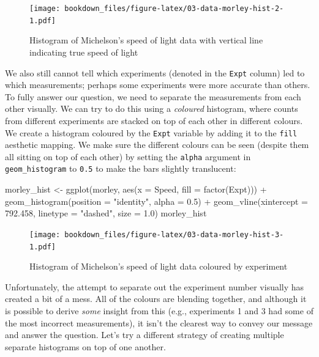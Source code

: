 \documentclass[
]{krantz}
\makeatletter
\newenvironment{Shaded}{\begin{snugshade}}{\end{snugshade}}
\newcommand{\AttributeTok}[1]{\textcolor[rgb]{0.61,0.61,0.61}{#1}}
\newcommand{\FloatTok}[1]{\textcolor[rgb]{0.06,0.06,0.06}{#1}}
\newcommand{\FunctionTok}[1]{\textcolor[rgb]{0,0,0}{#1}}
\newcommand{\NormalTok}[1]{#1}
\newcommand{\OtherTok}[1]{\textcolor[rgb]{0.37,0.37,0.37}{#1}}
\newcommand{\SpecialCharTok}[1]{\textcolor[rgb]{0,0,0}{#1}}
\newcommand{\StringTok}[1]{\textcolor[rgb]{0.5,0.5,0.5}{#1}}
\newenvironment{kframe}{%
\medskip{}
\setlength{\fboxsep}{.8em}
 \def\at@end@of@kframe{}%
 \ifinner\ifhmode%
  \def\at@end@of@kframe{\end{minipage}}%
  \begin{minipage}{\columnwidth}%
 \fi\fi%
 \def\FrameCommand##1{\hskip\@totalleftmargin \hskip-\fboxsep
 \colorbox{shadecolor}{##1}\hskip-\fboxsep
     \hskip-\linewidth \hskip-\@totalleftmargin \hskip\columnwidth}%
 \MakeFramed {\advance\hsize-\width
   \@totalleftmargin\z@ \linewidth\hsize
   \@setminipage}}%
 {\par\unskip\endMakeFramed%
 \at@end@of@kframe}
\renewenvironment{Shaded}{\begin{kframe}}{\end{kframe}}
\makeatother
\begin{document}
\begin{figure}
\centering
\texttt{[image: bookdown\_files/figure-latex/03-data-morley-hist-2-1.pdf]}
\caption{\label{fig:03-data-morley-hist-2}Histogram of Michelson's speed of light data with vertical line indicating true speed of light}
\end{figure}

We also still cannot tell which experiments (denoted in the \texttt{Expt} column) led to which measurements; perhaps some experiments were more accurate than
others. To fully answer our question, we need to separate the measurements from each other visually. We can
try to do this using a \emph{coloured} histogram, where counts from different experiments are stacked on top of each
other in different colours. We create a histogram coloured by the \texttt{Expt} variable by adding
it to the \texttt{fill} aesthetic mapping. We make sure the different colours can
be seen (despite them all sitting on top of each other) by setting the \texttt{alpha} argument in \texttt{geom\_histogram}
to \texttt{0.5} to make the bars slightly translucent:

\begin{Shaded}
\begin{Highlighting}[]
\NormalTok{morley\_hist }\OtherTok{\textless{}{-}} \FunctionTok{ggplot}\NormalTok{(morley, }\FunctionTok{aes}\NormalTok{(}\AttributeTok{x =}\NormalTok{ Speed, }\AttributeTok{fill =} \FunctionTok{factor}\NormalTok{(Expt))) }\SpecialCharTok{+}
  \FunctionTok{geom\_histogram}\NormalTok{(}\AttributeTok{position =} \StringTok{"identity"}\NormalTok{, }\AttributeTok{alpha =} \FloatTok{0.5}\NormalTok{) }\SpecialCharTok{+}
  \FunctionTok{geom\_vline}\NormalTok{(}\AttributeTok{xintercept =} \FloatTok{792.458}\NormalTok{, }\AttributeTok{linetype =} \StringTok{"dashed"}\NormalTok{, }\AttributeTok{size =} \FloatTok{1.0}\NormalTok{)}
\NormalTok{morley\_hist}
\end{Highlighting}
\end{Shaded}

\begin{figure}
\centering
\texttt{[image: bookdown\_files/figure-latex/03-data-morley-hist-3-1.pdf]}
\caption{\label{fig:03-data-morley-hist-3}Histogram of Michelson's speed of light data coloured by experiment}
\end{figure}

Unfortunately, the attempt to separate out the experiment number visually has created a bit of a mess. All of the colours
are blending together, and although it is possible to derive \emph{some} insight from this (e.g., experiments 1 and 3 had some
of the most incorrect measurements), it isn't the clearest way to convey our message and answer the question. Let's try a different strategy of
creating multiple separate histograms on top of one another.
\end{document}
